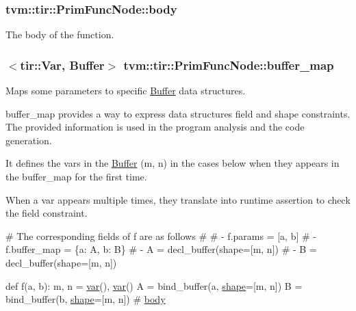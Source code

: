 \subsubsection[{\texorpdfstring{body}{body}}]{ tvm\+::tir\+::\+Prim\+Func\+Node\+::body}\hypertarget{classtvm_1_1tir_1_1PrimFuncNode_a9fce10a00a4a34c1fa52f7cca25b7e3b}{}\label{classtvm_1_1tir_1_1PrimFuncNode_a9fce10a00a4a34c1fa52f7cca25b7e3b}


The body of the function. 

\subsubsection[{\texorpdfstring{buffer\+\_\+map}{buffer_map}}]{$<${\bf tir\+::\+Var}, {\bf Buffer}$>$ tvm\+::tir\+::\+Prim\+Func\+Node\+::buffer\+\_\+map}\hypertarget{classtvm_1_1tir_1_1PrimFuncNode_aeb1f162516e09122852496f2a945d100}{}\label{classtvm_1_1tir_1_1PrimFuncNode_aeb1f162516e09122852496f2a945d100}


Maps some parameters to specific \hyperlink{classtvm_1_1tir_1_1Buffer}{Buffer} data structures. 

buffer\+\_\+map provides a way to express data structure\textquotesingle{}s field and shape constraints. The provided information is used in the program analysis and the code generation.


\begin{DoxyItemize}
\item It defines the vars in the \hyperlink{classtvm_1_1tir_1_1Buffer}{Buffer} (m, n) in the cases below when they appears in the buffer\+\_\+map for the first time.
\item When a var appears multiple times, they translate into runtime assertion to check the field constraint.
\end{DoxyItemize}


\begin{DoxyCode}
\textcolor{preprocessor}{# The corresponding fields of f are as follows}
\textcolor{preprocessor}{#}
\textcolor{preprocessor}{# - f.params = [a, b]}
\textcolor{preprocessor}{# - f.buffer\_map = \{a: A, b: B\}}
\textcolor{preprocessor}{# - A = decl\_buffer(shape=[m, n])}
\textcolor{preprocessor}{# - B = decl\_buffer(shape=[m, n])}

def f(a, b):
    m, n = \hyperlink{namespacetvm_1_1te_ae0c71f84710b436cbe0b32289d0838f4}{var}(), \hyperlink{namespacetvm_1_1te_ae0c71f84710b436cbe0b32289d0838f4}{var}()
    A = bind\_buffer(a, \hyperlink{namespacetopi_a649c66231bc50f3ed98ac8bb6b6e2518}{shape}=[m, n])
    B = bind\_buffer(b, \hyperlink{namespacetopi_a649c66231bc50f3ed98ac8bb6b6e2518}{shape}=[m, n])
    # \hyperlink{classtvm_1_1tir_1_1PrimFuncNode_a9fce10a00a4a34c1fa52f7cca25b7e3b}{body}
\end{DoxyCode}


